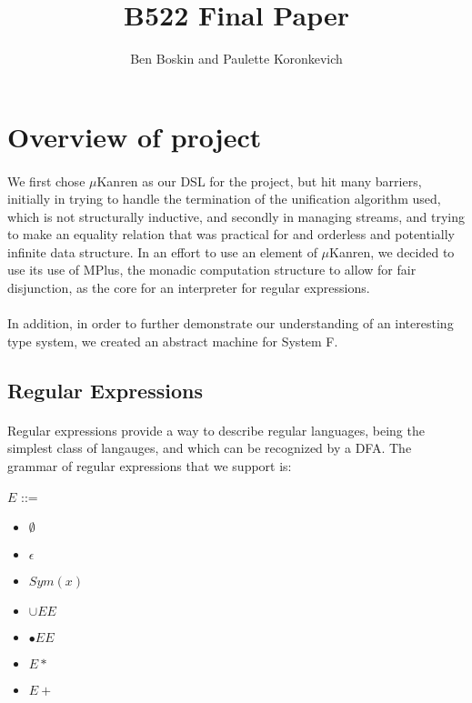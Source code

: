 \documentclass[12pt]{article}
\begin{document}
\title{B522 Final Paper}
\author{Ben Boskin and Paulette Koronkevich}
\maketitle


\section{Overview of project}
\paragraph{} We first chose $\mu$Kanren as our DSL for the project, but hit many barriers, initially in trying to handle the termination of the unification algorithm used, which is not structurally inductive, and secondly in managing streams, and trying to make an equality relation that was practical for and orderless and potentially infinite data structure. In an effort to use an element of $\mu$Kanren, we decided to use its use of MPlus, the monadic computation structure to allow for fair disjunction, as the core for an interpreter for regular expressions.
\paragraph{} In addition, in order to further demonstrate our understanding of an interesting type system, we created an abstract machine for System F.

\subsection{Regular Expressions}
\paragraph{} Regular expressions provide a way to describe regular languages, being the simplest class of langauges, and which can be recognized by a DFA. The grammar of regular expressions that we support is:


$E$ ::=
\begin{itemize}
  \item[] $\emptyset$
  \item[] $\epsilon$
  \item[] $Sym(x)$
  \item[] $\cup E E$
  \item[] $\bullet E E$
  \item[] $E *$  
  \item[] $E +$  
     
\end{itemize}
\end{document}
